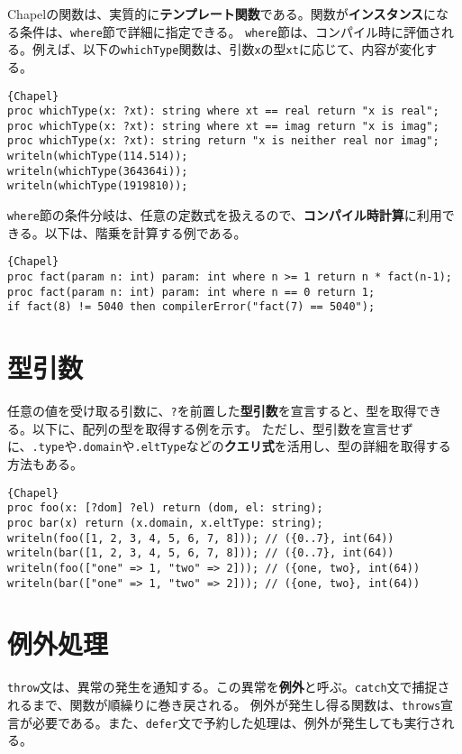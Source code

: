\documentclass[10pt,a4paper]{book}
\begin{document}
Chapelの関数は、実質的に\textbf{テンプレート関数}である。関数が\textbf{インスタンス}になる条件は、\texttt{where}節で詳細に指定できる。
\texttt{where}節は、コンパイル時に評価される。例えば、以下の\texttt{whichType}関数は、引数\texttt{x}の型\texttt{xt}に応じて、内容が変化する。

\begin{Verbatim}{Chapel}
proc whichType(x: ?xt): string where xt == real return "x is real";
proc whichType(x: ?xt): string where xt == imag return "x is imag";
proc whichType(x: ?xt): string return "x is neither real nor imag";
writeln(whichType(114.514));
writeln(whichType(364364i));
writeln(whichType(1919810));
\end{Verbatim}

\texttt{where}節の条件分岐は、任意の定数式を扱えるので、\textbf{コンパイル時計算}に利用できる。以下は、階乗を計算する例である。

\begin{Verbatim}{Chapel}
proc fact(param n: int) param: int where n >= 1 return n * fact(n-1);
proc fact(param n: int) param: int where n == 0 return 1;
if fact(8) != 5040 then compilerError("fact(7) == 5040");
\end{Verbatim}

\section{型引数}

任意の値を受け取る引数に、\texttt{?}を前置した\textbf{型引数}を宣言すると、型を取得できる。以下に、配列の型を取得する例を示す。
ただし、型引数を宣言せずに、\texttt{.type}や\texttt{.domain}や\texttt{.eltType}などの\textbf{クエリ式}を活用し、型の詳細を取得する方法もある。

\begin{Verbatim}{Chapel}
proc foo(x: [?dom] ?el) return (dom, el: string);
proc bar(x) return (x.domain, x.eltType: string);
writeln(foo([1, 2, 3, 4, 5, 6, 7, 8])); // ({0..7}, int(64))
writeln(bar([1, 2, 3, 4, 5, 6, 7, 8])); // ({0..7}, int(64))
writeln(foo(["one" => 1, "two" => 2])); // ({one, two}, int(64))
writeln(bar(["one" => 1, "two" => 2])); // ({one, two}, int(64))
\end{Verbatim}

\section{例外処理}

\texttt{throw}文は、異常の発生を通知する。この異常を\textbf{例外}と呼ぶ。\texttt{catch}文で捕捉されるまで、関数が順繰りに巻き戻される。
例外が発生し得る関数は、\texttt{throws}宣言が必要である。また、\texttt{defer}文で予約した処理は、例外が発生しても実行される。
\end{document}
